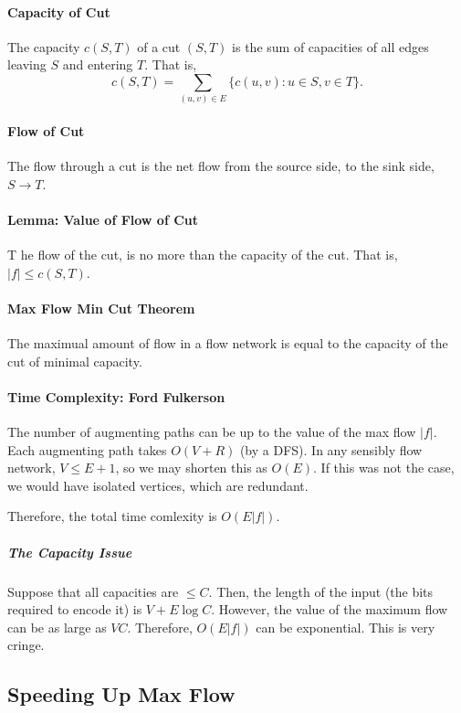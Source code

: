 \paragraph{Capacity of Cut}
The capacity \( c(S, T) \) of a cut  \( (S, T) \)
is the sum of capacities of all edges leaving  \( S \) and entering \( T \).
That is, \[
    c(S, T) = \sum_{(u, v) \in  E} \{ c(u, v) : u \in S, v \in T \} 
.\]


\paragraph{Flow of Cut}
The flow through a cut is the net flow from the source side, to the sink side,
\( S \to  T \).

\paragraph{Lemma: Value of Flow of Cut}
T he flow of the cut, is no more than the capacity of the cut.
That is, \( |f| \leq c(S, T) \).

\paragraph{Max Flow Min Cut Theorem}
The maximual amount of flow in a flow network is equal to the capacity of the
cut of minimal capacity.

\paragraph{Time Complexity: Ford Fulkerson}
The number of augmenting paths can be up to the value of the max flow \(|f|\).
Each augmenting path takes \(O(V + R)\) (by a DFS).
In any sensibly flow network, \(V \leq E + 1\), so we may shorten
this as \(O(E)\). If this was not the case, we would have isolated vertices,
which are redundant.

Therefore, the total time comlexity is \(O(E|f|)\).

\subparagraph{The Capacity Issue}
Suppose that all capacities are \(\leq C\). Then, the length
of the input (the bits required to encode it) is \(V + E\log C\).
However, the value of the maximum flow can be as large as \(VC\). 
Therefore, \(O(E|f|)\) can be exponential. This is very cringe.

\subsection{Speeding Up Max Flow}

